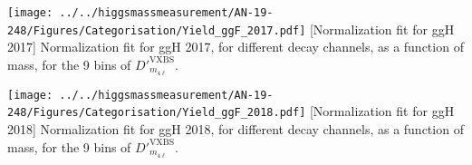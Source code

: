 \begin{multiFigure}
    \centering
		\texttt{[image: ../../higgsmassmeasurement/AN-19-248/Figures/Categorisation/Yield\_ggF\_2017.pdf]}
        [Normalization fit for ggH 2017]
        {Normalization fit for ggH 2017, for different decay channels, as a function of mass, for the 9 bins of $D'^{\text{VXBS}}_{m_{4\ell}}$.}
    \label{signal_normalization_2017}
\end{multiFigure}
\begin{multiFigure}
    \centering
		\texttt{[image: ../../higgsmassmeasurement/AN-19-248/Figures/Categorisation/Yield\_ggF\_2018.pdf]}
        [Normalization fit for ggH 2018]
        {Normalization fit for ggH 2018, for different decay channels, as a function of mass, for the 9 bins of $D'^{\text{VXBS}}_{m_{4\ell}}$.}
    \label{signal_normalization_2018}
\end{multiFigure}

